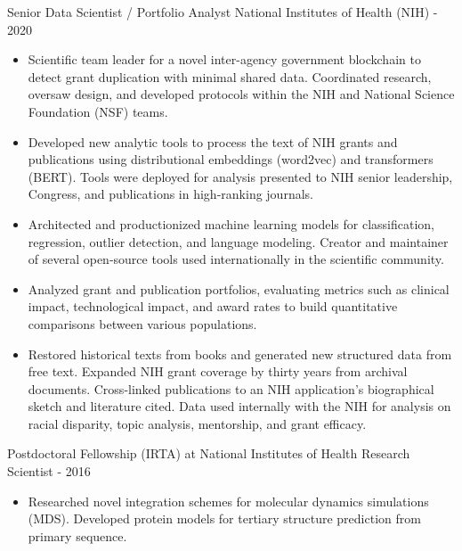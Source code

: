 \documentclass[]{scrartcl}
\begin{document}
\begin{cleanCV}
\WorkExperience
{}
{Senior Data Scientist / Portfolio Analyst}
{
  \newline National Institutes of Health (NIH)
   - 2020
}
{
  \vspace{-0.25em}
  \begin{itemize}
    
    \item Scientific team leader for a novel inter-agency government blockchain to detect grant duplication with minimal shared data. Coordinated research, oversaw design, and developed protocols within the NIH and National Science Foundation (NSF) teams.

    \item Developed new analytic tools to process the text of NIH grants and publications using distributional embeddings (word2vec) and transformers (BERT). Tools were deployed for analysis presented to NIH senior leadership, Congress, and publications in high-ranking journals.

    \item Architected and productionized machine learning models for classification, regression, outlier detection, and language modeling. Creator and maintainer of several open-source tools used internationally in the scientific community.

  \item Analyzed grant and publication portfolios, evaluating metrics such as clinical impact, technological impact, and award rates to build quantitative comparisons between various populations.
    
  \item Restored historical texts from books and generated new structured data from free text. Expanded NIH grant coverage by thirty years from archival documents. Cross-linked publications to an NIH application's biographical sketch and literature cited. Data used internally with the NIH for analysis on racial disparity, topic analysis, mentorship, and grant efficacy.    
    
  \end{itemize}
}

\vspace{0.5em}
 
\WorkExperience
{}
{Postdoctoral Fellowship (IRTA) at National Institutes of Health}
{
  \newline Research Scientist
   - 2016
}
{
  \begin{itemize}
  \item Researched novel integration schemes for molecular dynamics simulations (MDS). Developed protein models for tertiary structure prediction from primary sequence.


\end{itemize}}
\end{cleanCV}
\end{document}
